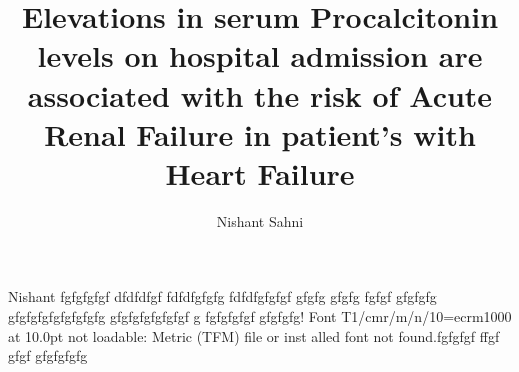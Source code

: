 \documentclass[10pt,a4paper,draft]{article}
\author{Nishant Sahni}
\title{Elevations in serum Procalcitonin levels on hospital admission are associated with the risk of Acute Renal Failure in patient's with Heart Failure }
\begin{document}
Nishant 
fgfgfgfgf
dfdfdfgf
fdfdfgfgfg
fdfdfgfgfgf
gfgfg
gfgfg
fgfgf
gfgfgfg
gfgfgfgfgfgfgfgfg
gfgfgfgfgfgfgf
g
fgfgfgfgf
gfgfgfg! Font T1/cmr/m/n/10=ecrm1000 at 10.0pt not loadable: Metric (TFM) file or inst
alled font not found.fgfgfgf
ffgf
gfgf
gfgfgfgfg
\end{document}
